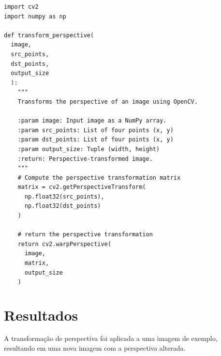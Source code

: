\documentclass[sigconf,nonacm]{acmart}
\begin{document}
\begin{verbatim}
import cv2
import numpy as np

def transform_perspective(
  image, 
  src_points, 
  dst_points, 
  output_size
  ):
    """
    Transforms the perspective of an image using OpenCV.

    :param image: Input image as a NumPy array.
    :param src_points: List of four points (x, y)
    :param dst_points: List of four points (x, y)
    :param output_size: Tuple (width, height)
    :return: Perspective-transformed image.
    """
    # Compute the perspective transformation matrix
    matrix = cv2.getPerspectiveTransform(
      np.float32(src_points), 
      np.float32(dst_points)
    )
    
    # return the perspective transformation
    return cv2.warpPerspective(
      image, 
      matrix, 
      output_size
    )
\end{verbatim}



\section{Resultados}
A transformação de perspectiva foi aplicada a uma imagem de exemplo, resultando em uma nova imagem com a perspectiva alterada.
\end{document}
